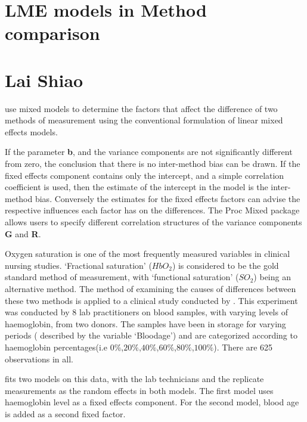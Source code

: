 \documentclass[12pt, a4paper]{report}
\begin{document}
\section{LME models in Method comparison}








\newpage
\section{Lai Shiao}
\citet{LaiShiao} use mixed models to determine the factors that
affect the difference of two methods of measurement using the
conventional formulation of linear mixed effects models.

If the parameter \textbf{b}, and the variance components are not
significantly different from zero, the conclusion that there is no
inter-method bias can be drawn. If the fixed effects component
contains only the intercept, and a simple correlation coefficient
is used, then the estimate of the intercept in the model is the
inter-method bias. Conversely the estimates for the fixed effects
factors can advise the respective influences each factor has on
the differences. The Proc Mixed package allows users to specify
different correlation structures of the variance components
\textbf{G} and \textbf{R}.


Oxygen saturation is one of the most frequently measured variables
in clinical nursing studies. `Fractional saturation' ($HbO_{2}$)
is considered to be the gold standard method of measurement, with
`functional saturation' ($SO_{2}$) being an alternative method.
The method of examining the causes of differences between these
two methods is applied to a clinical study conducted by
\citet{Shiao}. This experiment was conducted by 8 lab
practitioners on blood samples, with varying levels of
haemoglobin, from two donors. The samples have been in storage for
varying periods ( described by the variable `Bloodage') and are
categorized according to haemoglobin percentages(i.e
$0\%$,$20\%$,$40\%$,$60\%$,$80\%$,$100\%$). There are 625
observations in all.

\citet{LaiShiao} fits two models on this data, with the lab
technicians and the replicate measurements as the random effects
in both models. The first model uses haemoglobin level as a fixed
effects component. For the second model, blood age is added as a
second fixed factor.
\end{document}
